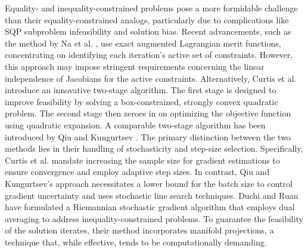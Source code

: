 \documentclass[aos]{imsart}
\numberwithin{equation}{section}
\theoremstyle{plain}
\begin{document}
Equality- and inequality-constrained problems pose a more formidable challenge than their equality-constrained analogs, particularly due to complications like SQP subproblem infeasibility and solution bias. 
Recent advancements, such as the method by Na et al. \cite{na2023adaptive}, use exact augmented Lagrangian merit functions, concentrating on identifying each iteration's active set of constraints. However, this approach may impose stringent requirements concerning the linear independence of Jacobians for the active constraints.
Alternatively, Curtis et al. \cite{curtis2023sequential} introduce an innovative two-stage algorithm. 
The first stage is designed to improve feasibility by solving a box-constrained, strongly convex quadratic problem. 
The second stage then zeroes in on optimizing the objective function using quadratic expansion. 
A comparable two-stage algorithm has been introduced by Qiu and Kungurtsev \cite{qiu2023sequential}.
The primary distinction between the two methods lies in their handling of stochasticity and step-size selection. 
Specifically, Curtis et al. mandate increasing the sample size for gradient estimations to ensure convergence and employ adaptive step sizes. 
In contrast, Qiu and Kungurtsev's approach \cite{qiu2023sequential} necessitates a lower bound for the batch size to control gradient uncertainty and uses stochastic line search techniques.
Duchi and Ruan \cite{duchi2021asymptotic} have formulated a Riemannian stochastic gradient algorithm that employs dual averaging to address inequality-constrained problems. 
To guarantee the feasibility of the solution iterates, their method incorporates manifold projections, a technique that, while effective, tends to be computationally demanding.
\end{document}

